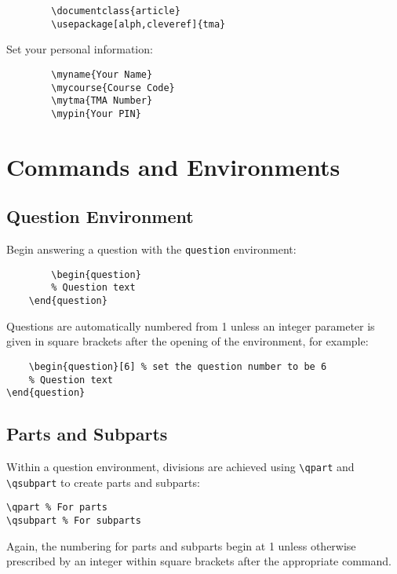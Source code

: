 \documentclass{article}
\begin{document}
	\begin{verbatim}
		\documentclass{article}
		\usepackage[alph,cleveref]{tma}
	\end{verbatim}
	
	Set your personal information:
	
	\begin{verbatim}
		\myname{Your Name}
		\mycourse{Course Code}
		\mytma{TMA Number}
		\mypin{Your PIN}
	\end{verbatim}
	
	\section{Commands and Environments}
	
	\subsection{Question Environment}
	
	Begin answering a question with the \texttt{question} environment:
	
	\begin{verbatim}
		\begin{question}
		% Question text
	\end{question}
\end{verbatim}

Questions are automatically numbered from 1 unless an integer parameter is given in square brackets after the opening of the environment, for example:

\begin{verbatim}
	\begin{question}[6] % set the question number to be 6
	% Question text
\end{question}
\end{verbatim}

\subsection{Parts and Subparts}

Within a question environment, divisions are achieved using \verb|\qpart| and \verb|\qsubpart| to create parts and subparts:

\begin{verbatim}
\qpart % For parts
\qsubpart % For subparts
\end{verbatim}

Again, the numbering for parts and subparts begin at 1 unless otherwise prescribed by an integer within square brackets after the appropriate command.
\end{document}
